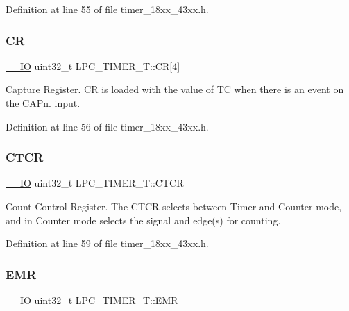Definition at line 55 of file timer\+\_\+18xx\+\_\+43xx.\+h.

\mbox{\label{struct_l_p_c___t_i_m_e_r___t_aa352dc65884c0a7b8888736a90a4bb7b}} 
\subsubsection{\texorpdfstring{CR}{CR}}
{\footnotesize\ttfamily \hyperlink{core__sc300_8h_aec43007d9998a0a0e01faede4133d6be}{\+\_\+\+\_\+\+IO} uint32\+\_\+t L\+P\+C\+\_\+\+T\+I\+M\+E\+R\+\_\+\+T\+::\+CR\mbox{[}4\mbox{]}}

Capture Register. CR is loaded with the value of TC when there is an event on the C\+A\+Pn. input. 

Definition at line 56 of file timer\+\_\+18xx\+\_\+43xx.\+h.

\mbox{\label{struct_l_p_c___t_i_m_e_r___t_a8bee15636f5bce5c6d3f3fcd4d8cf513}} 
\subsubsection{\texorpdfstring{C\+T\+CR}{CTCR}}
{\footnotesize\ttfamily \hyperlink{core__sc300_8h_aec43007d9998a0a0e01faede4133d6be}{\+\_\+\+\_\+\+IO} uint32\+\_\+t L\+P\+C\+\_\+\+T\+I\+M\+E\+R\+\_\+\+T\+::\+C\+T\+CR}

Count Control Register. The C\+T\+CR selects between Timer and Counter mode, and in Counter mode selects the signal and edge(s) for counting. 

Definition at line 59 of file timer\+\_\+18xx\+\_\+43xx.\+h.

\mbox{\label{struct_l_p_c___t_i_m_e_r___t_a92df4dc0b947774e8cf040b5c2c2ae30}} 
\subsubsection{\texorpdfstring{E\+MR}{EMR}}
{\footnotesize\ttfamily \hyperlink{core__sc300_8h_aec43007d9998a0a0e01faede4133d6be}{\+\_\+\+\_\+\+IO} uint32\+\_\+t L\+P\+C\+\_\+\+T\+I\+M\+E\+R\+\_\+\+T\+::\+E\+MR}

